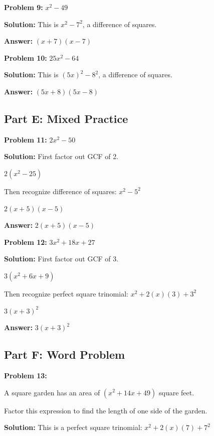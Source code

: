 \documentclass[12pt]{article}
\begin{document}
		\textbf{Problem 9:} $x^2 - 49$
		
		\textbf{Solution:} This is $x^2 - 7^2$, a difference of squares.
		
		\textbf{Answer:} $(x + 7)(x - 7)$

		\vspace{0.5cm}

		\textbf{Problem 10:} $25x^2 - 64$
		
		\textbf{Solution:} This is $(5x)^2 - 8^2$, a difference of squares.
		
		\textbf{Answer:} $(5x + 8)(5x - 8)$

	\newpage

	\subsection*{Part E: Mixed Practice}

		\textbf{Problem 11:} $2x^2 - 50$
		
		\textbf{Solution:} First factor out GCF of 2.
		
		$2(x^2 - 25)$
		
		Then recognize difference of squares: $x^2 - 5^2$
		
		$2(x + 5)(x - 5)$
		
		\textbf{Answer:} $2(x + 5)(x - 5)$

		\vspace{0.5cm}

		\textbf{Problem 12:} $3x^2 + 18x + 27$
		
		\textbf{Solution:} First factor out GCF of 3.
		
		$3(x^2 + 6x + 9)$
		
		Then recognize perfect square trinomial: $x^2 + 2(x)(3) + 3^2$
		
		$3(x + 3)^2$
		
		\textbf{Answer:} $3(x + 3)^2$

	\subsection*{Part F: Word Problem}

		\textbf{Problem 13:}
		
		A square garden has an area of $(x^2 + 14x + 49)$ square feet.
		
		Factor this expression to find the length of one side of the garden.
		
		\textbf{Solution:} This is a perfect square trinomial: $x^2 + 2(x)(7) + 7^2$
		
\end{document}
